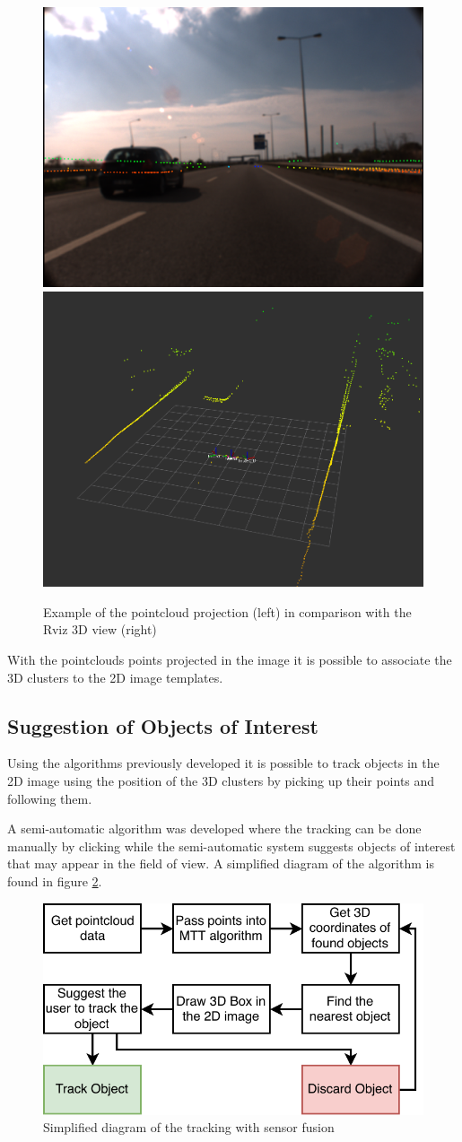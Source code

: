 \begin{figure}[htp]
	
	\centering
	\includegraphics[width=.47\textwidth]{caplabel/imgs/projectpc.png}
	\includegraphics[width=.45\textwidth]{caplabel/imgs/rvizpc.png}
	
	\caption{Example of the pointcloud projection (left) in comparison with the Rviz 3D view (right)}
	\label{fig:projectpoints}
	
\end{figure}

With the pointclouds points projected in the image it is possible to associate the 3D clusters to the 2D image templates.


\subsection{Suggestion of Objects of Interest}

Using the algorithms previously developed it is possible to track objects in the 2D image using the position of the 3D clusters by picking up their points and following them.

A semi-automatic algorithm was developed where the tracking can be done manually by clicking while the semi-automatic system suggests objects of interest that may appear in the field of view. A simplified diagram of the algorithm is found in figure \ref{fig:bbdiagram}.

\begin{figure}[htp]
	
	\centering
	\includegraphics[width=.6\textwidth]{caplabel/imgs/bbdiagram.pdf}
	
	\caption{Simplified diagram of the tracking with sensor fusion}
	\label{fig:bbdiagram}
	
\end{figure}

